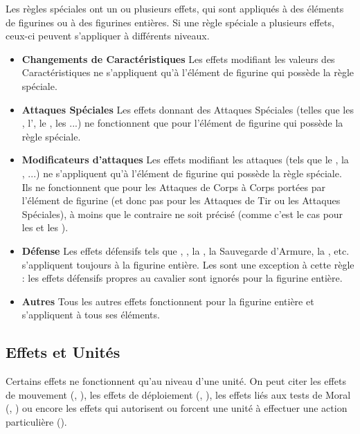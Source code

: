 Les règles spéciales ont un ou plusieurs effets, qui sont appliqués à des éléments de figurines ou à des figurines entières. Si une règle spéciale a plusieurs effets, ceux-ci peuvent s'appliquer à différents niveaux.

\begin{itemize}[label={\textbullet}]
\item \textbf{Changements de Caractéristiques}\newline
Les effets modifiant les valeurs des Caractéristiques ne s'appliquent qu'à l'élément de figurine qui possède la règle spéciale.
\item \textbf{Attaques Spéciales}\newline
Les effets donnant des Attaques Spéciales (telles que les \grindingattacks{}, l'\breathweapon{}, le \stomp{}, les \impacthits{}...) ne fonctionnent que pour l'élément de figurine qui possède la règle spéciale.
\item \textbf{Modificateurs d'attaques}\newline
Les effets modifiant les attaques (tels que le , la \hatred{}, \armourpiercing{}...) ne s'appliquent qu'à l'élément de figurine qui possède la règle spéciale. Ils ne fonctionnent que pour les Attaques de Corps à Corps portées par l'élément de figurine (et donc pas pour les Attaques de Tir ou les Attaques Spéciales), à moins que le contraire ne soit précisé (comme c'est le cas pour les \poisonedattacks{} et les \magicalattacks{}).
\item \textbf{Défense}\newline
Les effets défensifs tels que \distracting{}, \fireborn{}, la \regeneration{}, la Sauvegarde d'Armure, la \wardsave{}, etc. s'appliquent toujours à la figurine entière.\newline
Les \riddenmonsters{} sont une exception à cette règle : les effets défensifs propres au cavalier sont ignorés pour la figurine entière.
\item \textbf{Autres}\newline
Tous les autres effets fonctionnent pour la figurine entière et s'appliquent à tous ses éléments.
\end{itemize}

\subsection{Effets et Unités}

Certains effets ne fonctionnent qu'au niveau d'une unité. On peut citer les effets de mouvement (\fastcavalry{}, \fly{}), les effets de déploiement (\vanguard{}, \scout{}), les effets liés aux tests de Moral (\unbreakable{}, \unstable{}) ou encore les effets qui autorisent ou forcent une unité à effectuer une action particulière (\frenzy{}).


